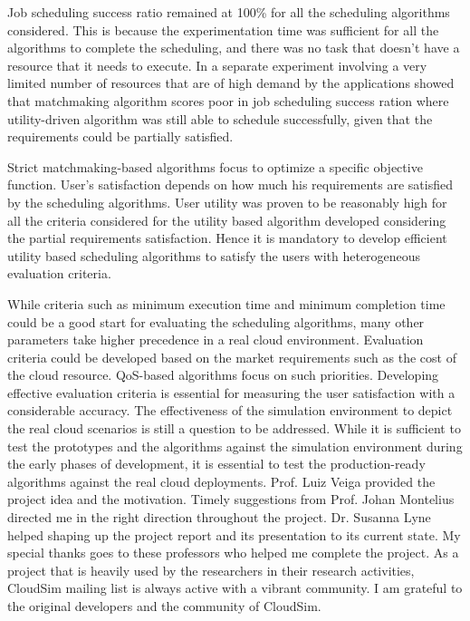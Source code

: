 \documentclass[times, 10pt,twocolumn]{article}
\begin{document}
Job scheduling success ratio remained at 100\% for all the scheduling algorithms considered. This is because the experimentation time was sufficient for all the algorithms to complete the scheduling, and there was no task that doesn't have a resource that it needs to execute. In a separate experiment involving a very limited number of resources that are of high demand by the applications showed that matchmaking algorithm scores poor in job scheduling success ration where utility-driven algorithm was still able to schedule successfully, given that the requirements could be partially satisfied.

Strict matchmaking-based algorithms focus to optimize a specific objective function. User's satisfaction depends on how much his requirements are satisfied by the scheduling algorithms. User utility was proven to be reasonably high for all the criteria considered for the utility based algorithm developed considering the partial requirements satisfaction. Hence it is mandatory to develop efficient utility based scheduling algorithms to satisfy the users with heterogeneous evaluation criteria.

While criteria such as minimum execution time and minimum completion time could be a good start for evaluating the scheduling algorithms, many other parameters take higher precedence in a real cloud environment. Evaluation criteria could be developed based on the market requirements such as the cost of the cloud resource. QoS-based algorithms focus on such priorities. Developing effective evaluation criteria is essential for measuring the user satisfaction with a considerable accuracy. The effectiveness of the simulation environment to depict the real cloud scenarios is still a question to be addressed. While it is sufficient to test the prototypes and the algorithms against the simulation environment during the early phases of development, it is essential to test the production-ready algorithms against the real cloud deployments.
Prof. Luiz Veiga provided the project idea and the motivation. Timely suggestions from Prof. Johan Montelius directed me in the right direction throughout the project. Dr. Susanna Lyne helped shaping up the project report and its presentation to its current state. My special thanks goes to these professors who helped me complete the project. As a project that is heavily used by the researchers in their research activities, CloudSim mailing list is always active with a vibrant community. I am grateful to the original developers and the community of CloudSim.
\end{document}

